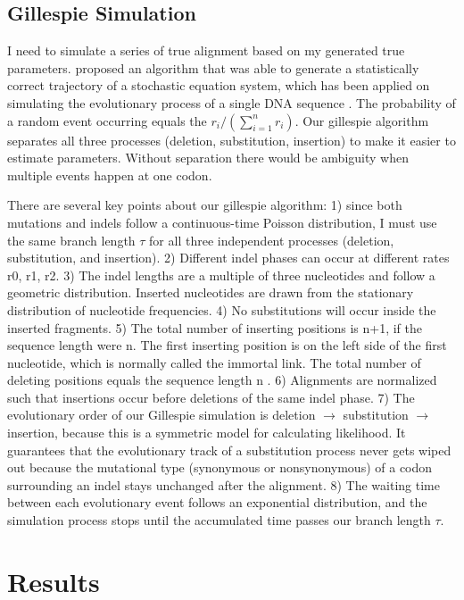 \subsection{Gillespie Simulation}
I need to simulate a series of true alignment based on my generated true parameters. \cite{gillespie1977exact} proposed an algorithm that was able to generate a statistically correct trajectory of a stochastic equation system, which has been applied on simulating the evolutionary process of a single DNA sequence \parencite{sipos2011phylosim}. The probability of a random event occurring equals the $r_i/(\sum_{i=1}^n r_i)$. Our gillespie algorithm separates all three processes (deletion, substitution, insertion) to make it easier to estimate parameters. Without separation there would be ambiguity when multiple events happen at one codon. 

There are several key points about our gillespie algorithm: 1) since both mutations and indels follow a continuous-time Poisson distribution, I must use the same branch length $\tau$ for all three independent processes (deletion, substitution, and insertion). 2) Different indel phases can occur at different rates r0, r1, r2. 3) The indel lengths are a multiple of three nucleotides and follow a geometric distribution. Inserted nucleotides are drawn from the stationary distribution of nucleotide frequencies. 4) No substitutions will occur inside the inserted fragments. 5) The total number of inserting positions is n+1, if the sequence length were n. The first inserting position is on the left side of the first nucleotide, which is normally called the immortal link. The total number of deleting positions equals the sequence length n \parencite{thorne1991evolutionary}. 6) Alignments are normalized such that insertions occur before deletions of the same indel phase. 7) The evolutionary order of our Gillespie simulation is deletion $\rightarrow$ substitution $\rightarrow$ insertion, because this is a symmetric model for calculating likelihood. It guarantees that the evolutionary track of a substitution process never gets wiped out because the mutational type (synonymous or nonsynonymous) of a codon surrounding an indel stays unchanged after the alignment. 8) The waiting time between each evolutionary event follows an exponential distribution, and the simulation process stops until the accumulated time passes our branch length $\tau$. 

   


\section{Results}

